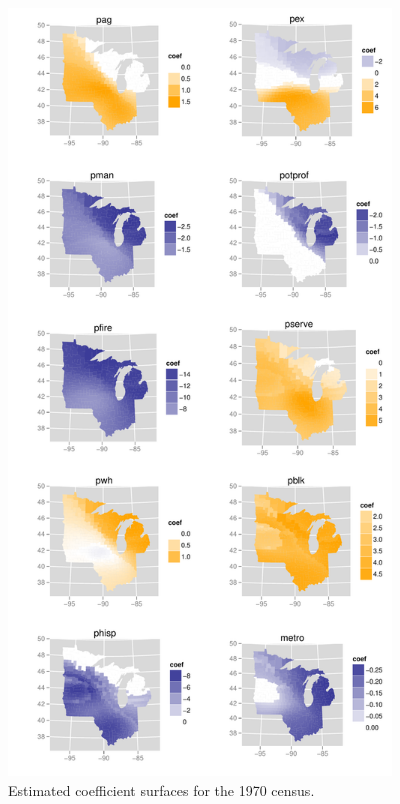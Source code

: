 \documentclass[authoryear, review, 11pt]{elsarticle}
\begin{document}
	\begin{figure}
		\begin{center}
			\includegraphics[height=8in]{../../figures/poverty/1970.linear.coefficients.pdf}
			\caption{Estimated coefficient surfaces for the 1970 census.\label{fig:census-coefs-1970}}
		\end{center}
	\end{figure}
	
\end{document}
